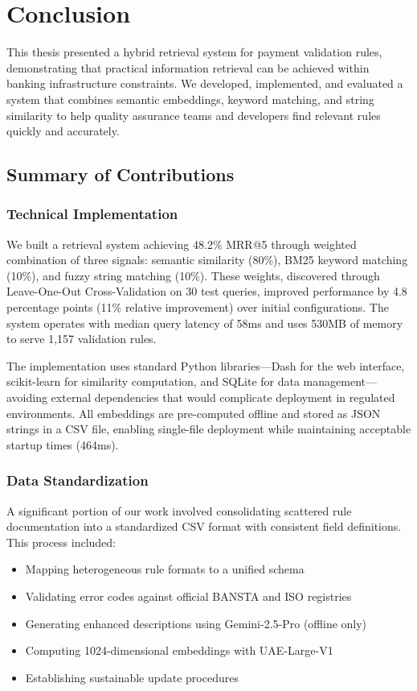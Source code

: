 \chapter{Conclusion}
\label{ch:conclusion}

This thesis presented a hybrid retrieval system for payment validation rules, demonstrating that practical information retrieval can be achieved within banking infrastructure constraints. We developed, implemented, and evaluated a system that combines semantic embeddings, keyword matching, and string similarity to help quality assurance teams and developers find relevant rules quickly and accurately.

\section{Summary of Contributions}

\subsection{Technical Implementation}

We built a retrieval system achieving 48.2\% MRR@5 through weighted combination of three signals: semantic similarity (80\%), BM25 keyword matching (10\%), and fuzzy string matching (10\%). These weights, discovered through Leave-One-Out Cross-Validation on 30 test queries, improved performance by 4.8 percentage points (11\% relative improvement) over initial configurations. The system operates with median query latency of 58ms and uses 530MB of memory to serve 1,157 validation rules.

The implementation uses standard Python libraries—Dash for the web interface, scikit-learn for similarity computation, and SQLite for data management—avoiding external dependencies that would complicate deployment in regulated environments. All embeddings are pre-computed offline and stored as JSON strings in a CSV file, enabling single-file deployment while maintaining acceptable startup times (464ms).

\subsection{Data Standardization}

A significant portion of our work involved consolidating scattered rule documentation into a standardized CSV format with consistent field definitions. This process included:

\begin{itemize}[leftmargin=*,itemsep=2pt,topsep=2pt]
  \item Mapping heterogeneous rule formats to a unified schema
  \item Validating error codes against official BANSTA and ISO registries  
  \item Generating enhanced descriptions using Gemini-2.5-Pro (offline only)
  \item Computing 1024-dimensional embeddings with UAE-Large-V1
  \item Establishing sustainable update procedures
\end{itemize}

